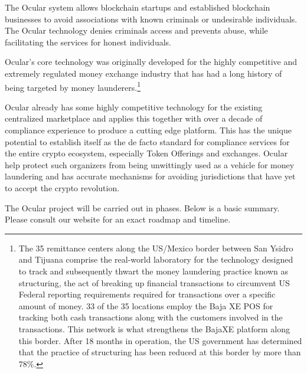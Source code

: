 \documentclass[a4paper]{article}
\begin{document}
The Ocular system allows blockchain startups and established blockchain businesses to avoid associations with known criminals or undesirable individuals. The Ocular technology denies criminals access and prevents abuse, while facilitating the services for honest individuals. 

Ocular’s core technology was originally developed for the highly competitive and extremely regulated money exchange industry that has had a long history of being targeted by money launderers.\footnote{The 35 remittance centers along the US/Mexico border between San Ysidro and Tijuana comprise the real-world laboratory for the technology designed to track and subsequently thwart the money laundering practice known as structuring, the act of breaking up financial transactions to circumvent US Federal reporting requirements required for transactions over a specific amount
of money. 33 of the 35 locations employ the Baja XE POS for tracking both cash transactions along with the customers involved in the transactions. This network is what strengthens the BajaXE platform along this border. After 18 months in operation, the US government has determined that the practice of structuring has been reduced at this border by more than 78\%.}

Ocular already has some highly competitive technology for the existing centralized marketplace and applies this together with over a decade of compliance experience to produce a cutting edge platform. This has the unique potential to establish itself as the de facto standard for compliance services for the entire crypto ecosystem, especially Token Offerings and exchanges. Ocular help protect such organizers from being unwittingly used as a vehicle for money laundering and has accurate mechanisms for avoiding jurisdictions that have yet to accept the crypto revolution. 

The Ocular project will be carried out in phases. Below is a basic summary. Please consult our website for an exact roadmap and timeline.
\end{document}
